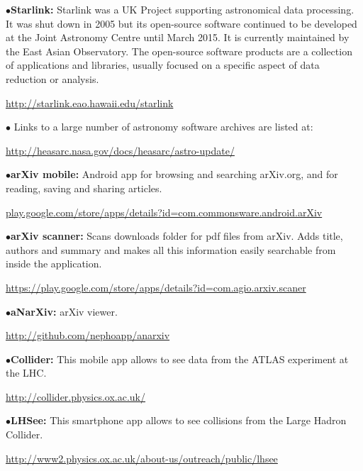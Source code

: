 \medskip

\item{$\bullet$}{\bf Starlink:}
Starlink was a UK Project supporting astronomical data processing. It was shut down in 2005 but its open-source software continued to be developed at the Joint Astronomy Centre until March 2015. It is currently maintained by the East Asian Observatory. The open-source software products are a collection of applications and libraries, usually focused on a specific aspect of data reduction or analysis.
	\item{}\qquad\url{http://starlink.eao.hawaii.edu/starlink}

\medskip

\item{$\bullet$}
Links to a large number of astronomy software archives are listed at:
	\item{}\qquad\url{http://heasarc.nasa.gov/docs/heasarc/astro-update/} 

\medskip
\medskip


\item{$\bullet$}{\bf arXiv mobile:}
Android app for browsing and searching arXiv.org, and for reading, saving and sharing articles.
	\item{}\qquad\url{play.google.com/store/apps/details?id=com.commonsware.android.arXiv}

\medskip

\item{$\bullet$}{\bf arXiv scanner:}
Scans downloads folder for pdf files from arXiv. Adds title, authors and summary and makes all this information easily searchable from inside the application.
	\item{}\qquad\url{https://play.google.com/store/apps/details?id=com.agio.arxiv.scaner}

\medskip

\item{$\bullet$}{\bf aNarXiv:}
arXiv viewer.
        \item{}\qquad\url{http://github.com/nephoapp/anarxiv}

\medskip

\item{$\bullet$}{\bf Collider:}
This mobile app allows to see data from the ATLAS experiment at the LHC.
	\item{}\qquad\url{http://collider.physics.ox.ac.uk/}

\medskip

\item{$\bullet$}{\bf LHSee:}
This smartphone app allows to see collisions from the Large Hadron Collider.
	\item{}\qquad\url{http://www2.physics.ox.ac.uk/about-us/outreach/public/lhsee}

